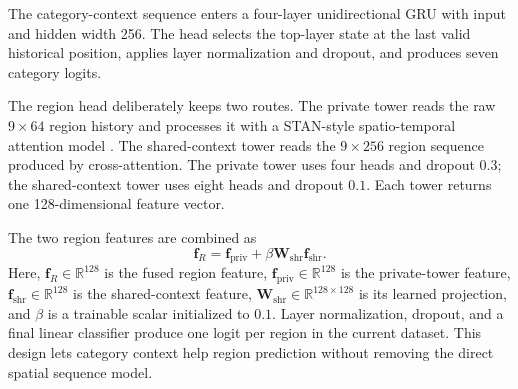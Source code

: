 The category-context sequence enters a four-layer unidirectional GRU with input and
hidden width 256. The head selects the top-layer state at the last valid historical
position, applies layer normalization and dropout, and produces seven category
logits.

The region head deliberately keeps two routes. The private tower reads the raw
$9\times64$ region history and processes it with a STAN-style spatio-temporal
attention model \cite{luo2021stan}. The shared-context tower reads the
$9\times256$ region sequence produced by cross-attention. The private tower uses
four heads and dropout $0.3$; the shared-context tower uses eight heads and dropout
$0.1$. Each tower returns one 128-dimensional feature vector.

The two region features are combined as
\begin{equation}
    \mathbf{f}_{R}
    =\mathbf{f}_{\mathrm{priv}}
    +\beta\mathbf{W}_{\mathrm{shr}}\mathbf{f}_{\mathrm{shr}}.
    \label{eq:apx-region-fusion}
\end{equation}
Here, $\mathbf{f}_{R}\in\mathbb{R}^{128}$ is the fused region feature,
$\mathbf{f}_{\mathrm{priv}}\in\mathbb{R}^{128}$ is the private-tower feature,
$\mathbf{f}_{\mathrm{shr}}\in\mathbb{R}^{128}$ is the shared-context feature,
$\mathbf{W}_{\mathrm{shr}}\in\mathbb{R}^{128\times128}$ is its learned projection,
and $\beta$ is a trainable scalar initialized to $0.1$. Layer normalization,
dropout, and a final linear classifier produce one logit per region in the current
dataset. This design lets category context help region prediction without removing
the direct spatial sequence model.

